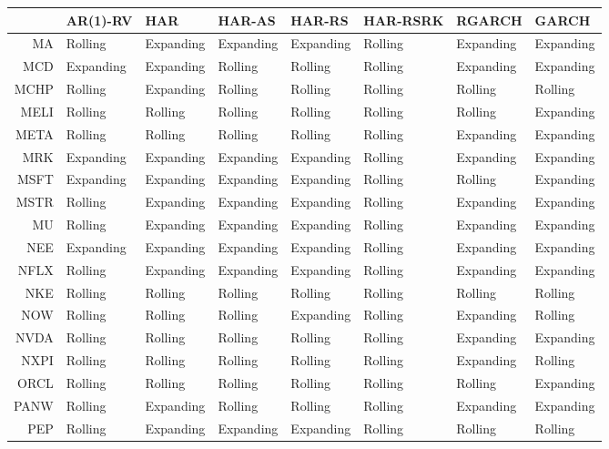 \begin{table}[ht]
\centering
\begin{tabular}{rlllllll}
  \hline
 & AR(1)-RV & HAR & HAR-AS & HAR-RS & HAR-RSRK & RGARCH & GARCH \\ 
  \hline
MA & Rolling & Expanding & Expanding & Expanding & Rolling & Expanding & Expanding \\ 
  MCD & Expanding & Expanding & Rolling & Rolling & Rolling & Expanding & Expanding \\ 
  MCHP & Rolling & Expanding & Rolling & Rolling & Rolling & Rolling & Rolling \\ 
  MELI & Rolling & Rolling & Rolling & Rolling & Rolling & Rolling & Expanding \\ 
  META & Rolling & Rolling & Rolling & Rolling & Rolling & Expanding & Expanding \\ 
  MRK & Expanding & Expanding & Expanding & Expanding & Rolling & Expanding & Expanding \\ 
  MSFT & Expanding & Expanding & Expanding & Expanding & Rolling & Rolling & Expanding \\ 
  MSTR & Rolling & Expanding & Expanding & Expanding & Rolling & Expanding & Expanding \\ 
  MU & Rolling & Expanding & Expanding & Expanding & Rolling & Expanding & Expanding \\ 
  NEE & Expanding & Expanding & Expanding & Expanding & Rolling & Expanding & Expanding \\ 
  NFLX & Rolling & Expanding & Expanding & Expanding & Rolling & Expanding & Expanding \\ 
  NKE & Rolling & Rolling & Rolling & Rolling & Rolling & Rolling & Rolling \\ 
  NOW & Rolling & Rolling & Rolling & Expanding & Rolling & Expanding & Rolling \\ 
  NVDA & Rolling & Rolling & Rolling & Rolling & Rolling & Expanding & Expanding \\ 
  NXPI & Rolling & Rolling & Rolling & Rolling & Rolling & Expanding & Rolling \\ 
  ORCL & Rolling & Rolling & Rolling & Rolling & Rolling & Rolling & Expanding \\ 
  PANW & Rolling & Expanding & Rolling & Rolling & Rolling & Expanding & Expanding \\ 
  PEP & Rolling & Expanding & Expanding & Expanding & Rolling & Rolling & Rolling \\ 

\end{tabular}
\end{table}
